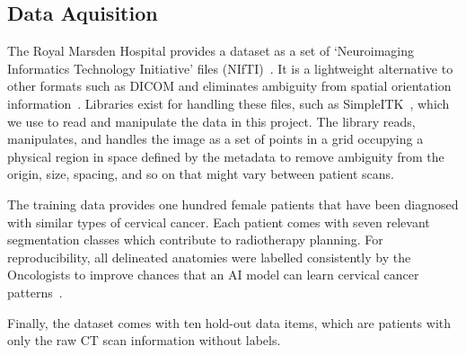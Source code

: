 \documentclass[12pt,twoside]{report}
\begin{document}

\subsection{Data Aquisition}

The Royal Marsden Hospital provides a dataset as a set of `Neuroimaging Informatics Technology Initiative' files (NIfTI)~\cite{file-formats}. It is a lightweight alternative to other formats such as DICOM and eliminates ambiguity from spatial orientation information~\cite{dicom-to-nifti-conversion}. Libraries exist for handling these files, such as SimpleITK~\cite{SimpleITK-paper}, which we use to read and manipulate the data in this project. The library reads, manipulates, and handles the image as a set of points in a grid occupying a physical region in space defined by the metadata to remove ambiguity from the origin, size, spacing, and so on that might vary between patient scans.

The training data provides one hundred female patients that have been diagnosed with similar types of cervical cancer. Each patient comes with seven relevant segmentation classes which contribute to radiotherapy planning. For reproducibility, all delineated anatomies were labelled consistently by the Oncologists to improve chances that an AI model can learn cervical cancer patterns~\cite{AMLART-data}. 

Finally, the dataset comes with ten hold-out data items, which are patients with only the raw CT scan information without labels.



\end{document}
